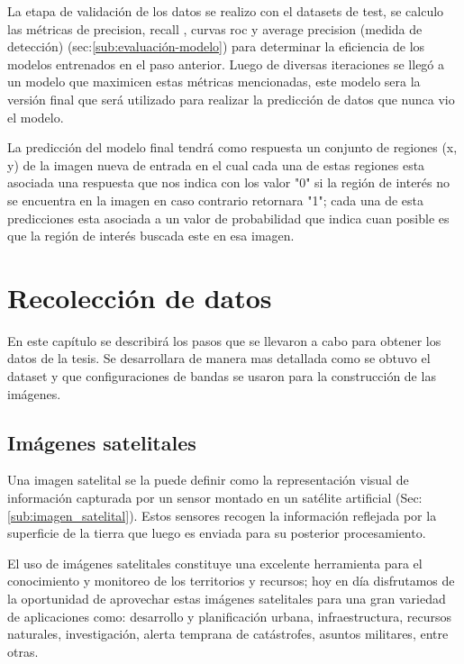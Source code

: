 La etapa de validación de los datos se realizo con el datasets de test, se calculo las métricas de precision, recall , curvas roc y average precision (medida de detección) (sec:\ref{sub:evaluación-modelo}) para determinar la eficiencia de los  modelos entrenados en el paso anterior. Luego de diversas iteraciones se llegó a un modelo que maximicen estas métricas mencionadas, este modelo sera la versión final que será utilizado para realizar la predicción de datos que nunca vio el modelo.

La predicción del modelo final tendrá como respuesta un conjunto de regiones (x, y) de la imagen nueva de entrada en el cual cada una de estas regiones esta asociada una respuesta que nos indica con los valor "0" si la región de interés no se encuentra en la imagen en caso contrario  retornara "1"; cada una de esta predicciones esta asociada a un valor de probabilidad que indica cuan posible es que la región de interés buscada este en esa imagen.

\section{Recolección de datos}\label{sec:recoleccion}

En este capítulo se describirá  los pasos que se llevaron a cabo para obtener los datos de la tesis. Se  desarrollara de manera mas detallada como se obtuvo el dataset y que configuraciones de bandas se usaron para la construcción de las imágenes.


\subsection{Imágenes satelitales}

Una imagen satelital se la puede definir como la representación visual de información capturada por un sensor montado en un satélite artificial (Sec:\ref{sub:imagen_satelital}). Estos sensores recogen la información reflejada por la superficie de la tierra que luego es enviada para su posterior procesamiento.

El uso de imágenes satelitales constituye una excelente herramienta para el conocimiento y monitoreo de los territorios y recursos; hoy en día disfrutamos de la oportunidad de aprovechar estas imágenes satelitales para una gran variedad de aplicaciones como: desarrollo y planificación urbana, infraestructura, recursos naturales, investigación, alerta temprana de catástrofes, asuntos militares, entre otras.

